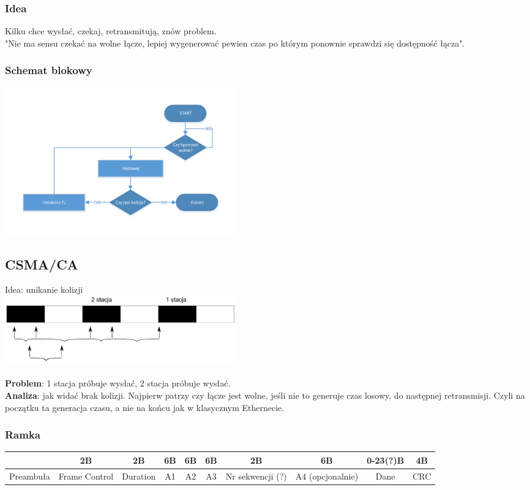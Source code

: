 \documentclass[a4paper,twoside]{article}
\begin{document}
		\subsubsection{Idea}
			Kilku chce wysłać, czekaj, retransmitują, znów problem.\\
			"Nie ma sensu czekać na wolne łącze, lepiej wygenerować pewien czas po którym ponownie sprawdzi się dostępność łącza".
		\subsubsection{Schemat blokowy}
			\includegraphics[width=10cm]{./images/image21.pdf}
	\subsection{CSMA/CA}
		Idea: unikanie kolizji\\
		\includegraphics[width=10cm]{./images/image22.pdf}\\\\
		\textbf{Problem}: 1 stacja próbuje wysłać, 2 stacja próbuje wysłać.\\
		\textbf{Analiza}: jak widać brak kolizji. Najpierw patrzy czy łącze jest wolne, jeśli nie to generuje czas losowy, do następnej retransmisji. Czyli na początku ta generacja czasu, a nie na końcu jak w klasycznym Ethernecie.
	\subsubsection{Ramka}
		\begin{tabular}{|c|c|c|c|c|c|c|c|c|c|}
			\hline  & 2B & 2B & 6B & 6B & 6B & 2B & 6B & 0-23(?)B & 4B \\ 
			\hline Preambuła & Frame Control & Duration & A1 & A2 & A3 & Nr sekwencji (?) & A4 (opcjonalnie) & Dane & CRC \\ 
			\hline 
		\end{tabular}
\end{document}
